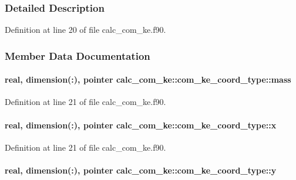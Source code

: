 \subsubsection{Detailed Description}


Definition at line 20 of file calc\-\_\-com\-\_\-ke.\-f90.



\subsubsection{Member Data Documentation}
\hypertarget{structcalc__com__ke_1_1com__ke__coord__type_adb7a38bb096e9e85ab86f97c9c58029a}{
\paragraph[{mass}]{\setlength{\rightskip}{0pt plus 5cm}real, dimension(\-:), pointer calc\-\_\-com\-\_\-ke\-::com\-\_\-ke\-\_\-coord\-\_\-type\-::mass}}\label{structcalc__com__ke_1_1com__ke__coord__type_adb7a38bb096e9e85ab86f97c9c58029a}


Definition at line 21 of file calc\-\_\-com\-\_\-ke.\-f90.

\hypertarget{structcalc__com__ke_1_1com__ke__coord__type_a038f1fe69d7e2c95647d31bffe742230}{
\paragraph[{x}]{\setlength{\rightskip}{0pt plus 5cm}real, dimension(\-:), pointer calc\-\_\-com\-\_\-ke\-::com\-\_\-ke\-\_\-coord\-\_\-type\-::x}}\label{structcalc__com__ke_1_1com__ke__coord__type_a038f1fe69d7e2c95647d31bffe742230}


Definition at line 21 of file calc\-\_\-com\-\_\-ke.\-f90.

\hypertarget{structcalc__com__ke_1_1com__ke__coord__type_a2f813ec865f20acee148b3e564bc786e}{
\paragraph[{y}]{\setlength{\rightskip}{0pt plus 5cm}real, dimension(\-:), pointer calc\-\_\-com\-\_\-ke\-::com\-\_\-ke\-\_\-coord\-\_\-type\-::y}}\label{structcalc__com__ke_1_1com__ke__coord__type_a2f813ec865f20acee148b3e564bc786e}


